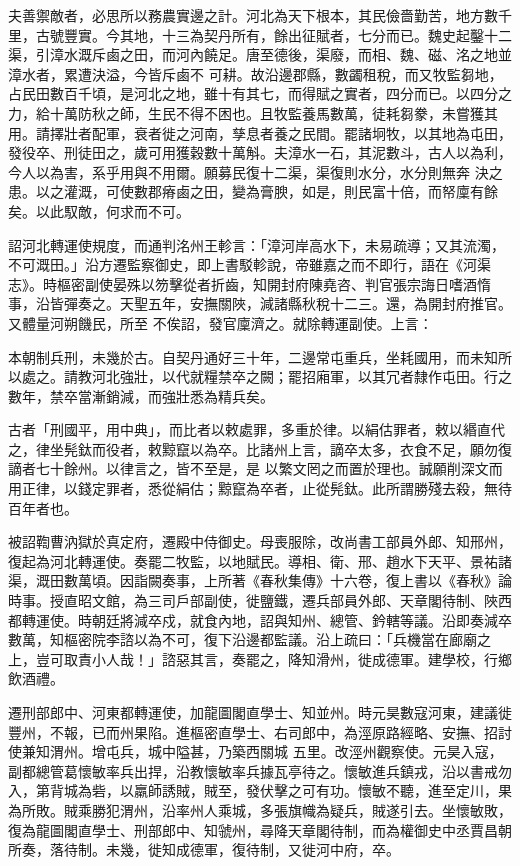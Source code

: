 \begin{pinyinscope}
 夫善禦敵者，必思所以務農實邊之計。河北為天下根本，其民儉嗇勤苦，地方數千里，古號豐實。今其地，十三為契丹所有，餘出征賦者，七分而已。魏史起鑿十二渠，引漳水溉斥鹵之田，而河內饒足。唐至德後，渠廢，而相、魏、磁、洺之地並漳水者，累遭決溢，今皆斥鹵不
 可耕。故沿邊郡縣，數蠲租稅，而又牧監芻地，占民田數百千頃，是河北之地，雖十有其七，而得賦之實者，四分而已。以四分之力，給十萬防秋之師，生民不得不困也。且牧監養馬數萬，徒耗芻豢，未嘗獲其用。請擇壯者配軍，衰者徙之河南，孳息者養之民間。罷諸坰牧，以其地為屯田，發役卒、刑徒田之，歲可用獲穀數十萬斛。夫漳水一石，其泥數斗，古人以為利，今人以為害，系乎用與不用爾。願募民復十二渠，渠復則水分，水分則無奔
 決之患。以之灌溉，可使數郡瘠鹵之田，變為膏腴，如是，則民富十倍，而帑廩有餘矣。以此馭敵，何求而不可。



 詔河北轉運使規度，而通判洺州王軫言：「漳河岸高水下，未易疏導；又其流濁，不可溉田。」沿方遷監察御史，即上書駁軫說，帝雖嘉之而不即行，語在《河渠志》。時樞密副使晏殊以笏擊從者折齒，知開封府陳堯咨、判官張宗誨日嗜酒惰事，沿皆彈奏之。天聖五年，安撫關陜，減諸縣秋稅十二三。還，為開封府推官。又體量河朔饑民，所至
 不俟詔，發官廩濟之。就除轉運副使。上言：



 本朝制兵刑，未幾於古。自契丹通好三十年，二邊常屯重兵，坐耗國用，而未知所以處之。請教河北強壯，以代就糧禁卒之闕；罷招廂軍，以其冗者隸作屯田。行之數年，禁卒當漸銷減，而強壯悉為精兵矣。



 古者「刑國平，用中典」，而比者以敕處罪，多重於律。以絹估罪者，敕以緡直代之，律坐髡鈦而役者，敕黥竄以為卒。比諸州上言，謫卒太多，衣食不足，願勿復謫者七十餘州。以律言之，皆不至是，是
 以繁文罔之而置於理也。誠願削深文而用正律，以錢定罪者，悉從絹估；黥竄為卒者，止從髡鈦。此所謂勝殘去殺，無待百年者也。



 被詔鞫曹汭獄於真定府，遷殿中侍御史。母喪服除，改尚書工部員外郎、知邢州，復起為河北轉運使。奏罷二牧監，以地賦民。導相、衛、邢、趙水下天平、景祐諸渠，溉田數萬頃。因詣闕奏事，上所著《春秋集傳》十六卷，復上書以《春秋》論時事。授直昭文館，為三司戶部副使，徙鹽鐵，遷兵部員外郎、天章閣待制、陜西
 都轉運使。時朝廷將減卒戍，就食內地，詔與知州、總管、鈐轄等議。沿即奏減卒數萬，知樞密院李諮以為不可，復下沿邊都監議。沿上疏曰：「兵機當在廊廟之上，豈可取責小人哉！」諮惡其言，奏罷之，降知滑州，徙成德軍。建學校，行鄉飲酒禮。



 遷刑部郎中、河東都轉運使，加龍圖閣直學士、知並州。時元昊數寇河東，建議徙豐州，不報，已而州果陷。進樞密直學士、右司郎中，為涇原路經略、安撫、招討使兼知渭州。增屯兵，城中隘甚，乃築西關城
 五里。改涇州觀察使。元昊入寇，副都總管葛懷敏率兵出捍，沿教懷敏率兵據瓦亭待之。懷敏進兵鎮戎，沿以書戒勿入，第背城為砦，以羸師誘賊，賊至，發伏擊之可有功。懷敏不聽，進至定川，果為所敗。賊乘勝犯渭州，沿率州人乘城，多張旗幟為疑兵，賊遂引去。坐懷敏敗，復為龍圖閣直學士、刑部郎中、知虢州，尋降天章閣待制，而為權御史中丞賈昌朝所奏，落待制。未幾，徙知成德軍，復待制，又徙河中府，卒。




\end{pinyinscope}
